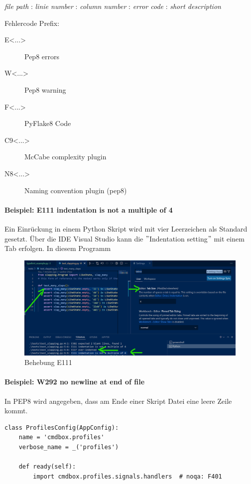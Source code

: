 \begin{center}
	\textit{file path} : \textit{linie number} : \textit{column number} : \textit{error code} : \textit{short description}
\end{center}

Fehlercode Prefix:
\begin{description}
	\item[E<...>] Pep8 errors
	\item[W<...>] Pep8 warning
	\item[F<...>] PyFlake8 Code
	\item[C9<...>] McCabe complexity plugin 
	\item[N8<...>] Naming convention plugin (pep8)
\end{description}

\paragraph{Beispiel: E111 indentation is not a multiple of 4}
Ein Einrückung in einem Python Skript wird mit vier Leerzeichen als Standard gesetzt. Über die \gls{IDE} Visual Studio kann die $"$Indentation setting$"$ mit einem Tab erfolgen. In diesem Programm

\begin{figure}[H]
	\centering
	\includegraphics[scale = 0.6]{attachment/chapter_2/Scc081}
	\caption{Behebung E111}
\end{figure}

\paragraph{Beispiel: W292 no newline at end of file}
In PEP8 wird angegeben, dass am Ende einer Skript Datei eine leere Zeile kommt.

\begin{lstlisting}[style=python , caption={Schlechtes Beispiel}, captionpos=b]
class ProfilesConfig(AppConfig):
    name = 'cmdbox.profiles'
    verbose_name = _('profiles')

    def ready(self):
        import cmdbox.profiles.signals.handlers  # noqa: F401
\end{lstlisting}

